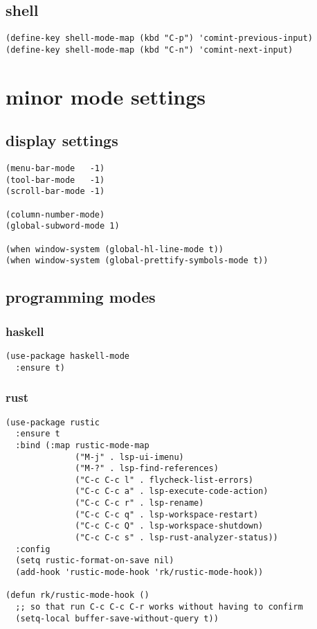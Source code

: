\documentclass[11pt]{article}
\begin{document}
\subsection{shell}
\label{sec:orgbfc03f8}
\begin{verbatim}
(define-key shell-mode-map (kbd "C-p") 'comint-previous-input)
(define-key shell-mode-map (kbd "C-n") 'comint-next-input)
\end{verbatim}
\section{minor mode settings}
\label{sec:org8b7b4e3}
\subsection{display settings}
\label{sec:org8eedc71}
\begin{verbatim}
(menu-bar-mode   -1)
(tool-bar-mode   -1)
(scroll-bar-mode -1)

(column-number-mode)
(global-subword-mode 1)

(when window-system (global-hl-line-mode t))
(when window-system (global-prettify-symbols-mode t))
\end{verbatim}
\subsection{programming modes}
\label{sec:orgce3806e}
\subsubsection{haskell}
\label{sec:org567d84e}
\begin{verbatim}
(use-package haskell-mode
  :ensure t)
\end{verbatim}
\subsubsection{rust}
\label{sec:org1ebc272}
\begin{verbatim}
(use-package rustic
  :ensure t
  :bind (:map rustic-mode-map
              ("M-j" . lsp-ui-imenu)
              ("M-?" . lsp-find-references)
              ("C-c C-c l" . flycheck-list-errors)
              ("C-c C-c a" . lsp-execute-code-action)
              ("C-c C-c r" . lsp-rename)
              ("C-c C-c q" . lsp-workspace-restart)
              ("C-c C-c Q" . lsp-workspace-shutdown)
              ("C-c C-c s" . lsp-rust-analyzer-status))
  :config
  (setq rustic-format-on-save nil)
  (add-hook 'rustic-mode-hook 'rk/rustic-mode-hook))

(defun rk/rustic-mode-hook ()
  ;; so that run C-c C-c C-r works without having to confirm
  (setq-local buffer-save-without-query t))

\end{verbatim}
\end{document}
